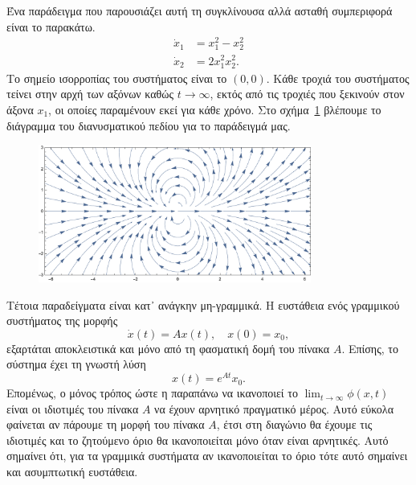 \begin{solution}
    Ένα παράδειγμα που παρουσιάζει αυτή τη συγκλίνουσα αλλά ασταθή συμπεριφορά
    είναι το παρακάτω.
    \begin{align*}
        \dot{x}_1 &= x_1^2 - x_2^2 \\
        \dot{x}_2 &= 2x_1^2x_2^2.
    \end{align*}
    Το σημείο ισορροπίας του συστήματος είναι το \( (0, 0) \). Κάθε τροχιά του
    συστήματος τείνει στην αρχή των αξόνων καθώς \( t \to \infty \), εκτός από
    τις τροχιές που ξεκινούν στον άξονα \( x_1 \), οι οποίες παραμένουν εκεί για
    κάθε χρόνο. Στο σχήμα~\ref{fig:ex1_unstable_convergent_example} βλέπουμε το
    διάγραμμα του διανυσματικού πεδίου για το παράδειγμά μας.
    \begin{figure}[h]
        \centering
        \includegraphics[width=0.8\textwidth]{figures/ex1_unstableConvergentExample.pdf}
        \caption{}
        \label{fig:ex1_unstable_convergent_example}
    \end{figure}

    Τέτοια παραδείγματα είναι κατ᾽ ανάγκην μη-γραμμικά. Η ευστάθεια ενός
    γραμμικού συστήματος της μορφής
    \begin{equation*}
        \dot{x}(t) = Ax(t), \quad x(0) = x_0,
    \end{equation*}
    εξαρτάται αποκλειστικά και μόνο από τη φασματική δομή του πίνακα \( A \).
    Επίσης, το σύστημα έχει τη γνωστή λύση
    \begin{equation*}
        x(t) = e^{At}x_0.
    \end{equation*}
    Επομένως, ο μόνος τρόπος ώστε η παραπάνω να ικανοποιεί το \( \lim_{t \to
    \infty} \phi(x, t) \) είναι οι ιδιοτιμές του πίνακα \( A \) να έχουν
    αρνητικό πραγματικό μέρος. Αυτό εύκολα φαίνεται αν πάρουμε τη μορφή
     του πίνακα \( A \), έτσι στη διαγώνιο θα έχουμε τις ιδιοτιμές
    και το ζητούμενο όριο θα ικανοποιείται μόνο όταν είναι αρνητικές. Αυτό
    σημαίνει ότι, για τα γραμμικά συστήματα αν ικανοποιείται το όριο τότε αυτό
    σημαίνει και ασυμπτωτική ευστάθεια.
\end{solution}
